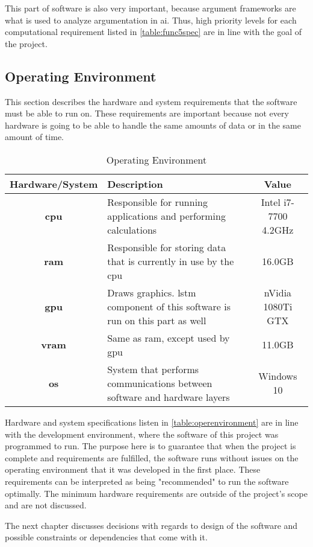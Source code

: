             This part of software is also very important, because argument frameworks are what is used to analyze argumentation in \gls{ai}. Thus, high priority levels for each computational requirement listed in \autoref{table:func5spec} are in line with the goal of the project.
        
    \subsection{Operating Environment}
        This section describes the hardware and system requirements that the software must be able to run on. These requirements are important because not every hardware is going to be able to handle the same amounts of data or in the same amount of time. 
        
        \begin{table}[!htbp]
            \centering
            \caption{Operating Environment}
            \begin{tabular}{|>{\bfseries}S|L|S|}
                \toprule
                \textbf{Hardware/System} & \textbf{Description} & \textbf{Value} \\ 
                \midrule
                \gls{cpu} & Responsible for running applications and performing calculations & Intel i7-7700 \@4.2GHz\\ \hline
                \gls{ram} & Responsible for storing data that is currently in use by the \gls{cpu} & 16.0GB\\ \hline
                \gls{gpu} & Draws graphics. \gls{lstm} component of this software is run on this part as well & nVidia 1080Ti GTX \\ \hline
                \gls{vram} & Same as \gls{ram}, except used by \gls{gpu} & 11.0GB\\ \hline
                \gls{os} & System that performs communications between software and hardware layers & Windows 10 \\ 
                \bottomrule
            \end{tabular}
            \label{table:operenvironment}
        \end{table}
        \FloatBarrier
        
        Hardware and system specifications listen in \autoref{table:operenvironment} are in line with the development environment, where the software of this project was programmed to run. The purpose here is to guarantee that when the project is complete and requirements are fulfilled, the software runs without issues on the operating environment that it was developed in the first place. These requirements can be interpreted as being "recommended" to run the software optimally. The minimum hardware requirements are outside of the project's scope and are not discussed.
        
        The next chapter discusses decisions with regards to design of the software and possible constraints or dependencies that come with it.